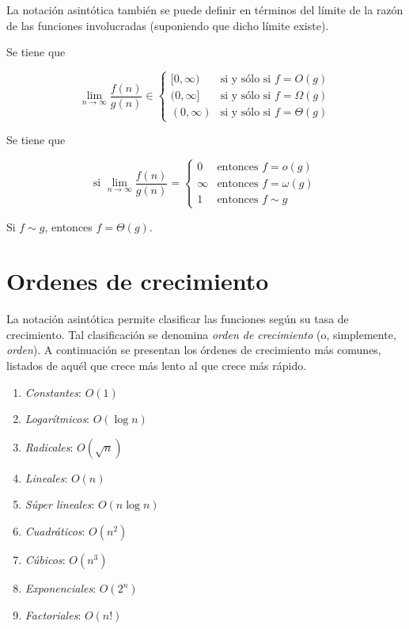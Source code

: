 La notación asintótica también se puede definir en términos del límite
de la razón de las funciones involucradas (suponiendo que dicho límite
existe). 

\begin{prop}
    Se tiene que
    
    \[
        \lim_{n\to\infty}\dfrac{f(n)}{g(n)}\in\begin{cases}
            [0,\infty) & \text{si y sólo si }f=O(g)\\
            (0,\infty] & \text{si y sólo si }f=\Omega(g)\\
            (0,\infty) & \text{si y sólo si }f=\Theta(g)
        \end{cases}
    \]
\end{prop}

\begin{prop}
    Se tiene que

    \[
        \text{si }\lim_{n\to\infty}\dfrac{f(n)}{g(n)}=\begin{cases}
        0 & \text{entonces }f=o(g)\\
        \infty & \text{entonces }f=\omega(g)\\
        1 & \text{entonces }f\sim g
        \end{cases}
    \]
\end{prop}

\begin{prop}
    Si $f\sim g$, entonces $f=\Theta(g)$.
\end{prop}

\section{Ordenes de crecimiento}

La notación asintótica permite clasificar las funciones según su tasa
de crecimiento. Tal clasificación se denomina \emph{orden de crecimiento}
(o, simplemente, \emph{orden}). A continuación se presentan los órdenes
de crecimiento más comunes, listados de aquél que crece más lento
al que crece más rápido.

\begin{enumerate}
    \item \emph{Constantes}: $O(1)$
    \item \emph{Logarítmicos}: $O(\log n)$
    \item \emph{Radicales}: $O(\sqrt{n})$
    \item \emph{Lineales}: $O(n)$
    \item \emph{Súper lineales}: $O(n\log n)$
    \item \emph{Cuadráticos}: $O(n^{2})$
    \item \emph{Cúbicos}: $O(n^{3})$
    \item \emph{Exponenciales}: $O(2^{n})$
    \item \emph{Factoriales}: $O(n!)$
\end{enumerate}

